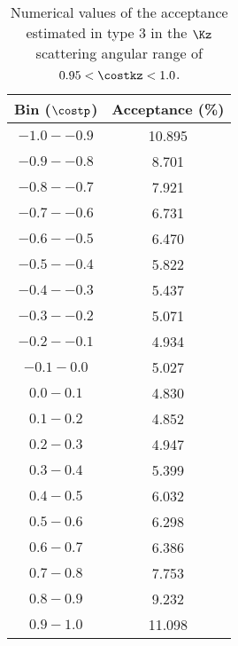 \begin{table}[!h] 
  \begin{center}
  \caption{Numerical values of the acceptance estimated in type 3 in the $\Kz$ scattering angular range of \textbf{$0.95<\costkz<1.0$}.}
  \centering
  \begin{threeparttable}
    \begin{tabular}{cc}
    Bin ($\costp$) & Acceptance (\%) \\
    \midrule\midrule
    $-1.0 - -0.9$ & 10.895 \\
    \midrule
    $-0.9 - -0.8$ & 8.701 \\
    \midrule
    $-0.8 - -0.7$ & 7.921 \\
    \midrule
    $-0.7 - -0.6$ & 6.731 \\
    \midrule
    $-0.6 - -0.5$ & 6.470 \\
    \midrule
    $-0.5 - -0.4$ & 5.822 \\
    \midrule
    $-0.4 - -0.3$ & 5.437 \\
    \midrule
    $-0.3 - -0.2$ & 5.071 \\
    \midrule
    $-0.2 - -0.1$ & 4.934 \\
    \midrule
    $-0.1 - 0.0$ & 5.027 \\
    \midrule
    $0.0 - 0.1$ & 4.830 \\
    \midrule
    $0.1 - 0.2$ & 4.852 \\
    \midrule
    $0.2 - 0.3$ & 4.947 \\
    \midrule
    $0.3 - 0.4$ & 5.399 \\
    \midrule
    $0.4 - 0.5$ & 6.032 \\
    \midrule
    $0.5 - 0.6$ & 6.298  \\
    \midrule
    $0.6 - 0.7$ & 6.386 \\
    \midrule
    $0.7 - 0.8$ & 7.753 \\
    \midrule
    $0.8 - 0.9$ & 9.232 \\
    \midrule
    $0.9 - 1.0$ & 11.098 \\
    \end{tabular}
  \end{threeparttable}
  \label{tab-Pl-acc_39}
  \end{center}
\end{table}





\clearpage
